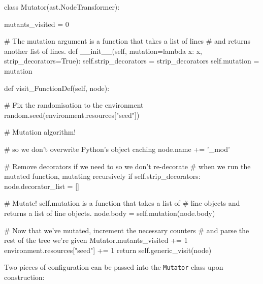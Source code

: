 \begin{pyglist}[language = python, caption={Mutator class}, listingname=\textbf{Code sample} \comment{, fvset={frame=single,framerule=1pt}}, numbers=left]
class Mutator(ast.NodeTransformer):

    mutants_visited = 0

    # The mutation argument is a function that takes a list of lines
    # and returns another list of lines.
    def __init__(self, mutation=lambda x: x, strip_decorators=True):
        self.strip_decorators = strip_decorators
        self.mutation = mutation

    def visit_FunctionDef(self, node):

        # Fix the randomisation to the environment
        random.seed(environment.resources["seed"])

        # Mutation algorithm!
        
        # so we don't overwrite Python's object caching
        node.name += '_mod'   
        
        # Remove decorators if we need to so we don't re-decorate
        # when we run the mutated function, mutating recursively
        if self.strip_decorators:
            node.decorator_list = []
        
        # Mutate! self.mutation is a function that takes a list of
        # line objects and returns a list of line objects.
        node.body = self.mutation(node.body)

        # Now that we've mutated, increment the necessary counters
        # and parse the rest of the tree we're given
        Mutator.mutants_visited += 1
        environment.resources["seed"] += 1
        return self.generic_visit(node)
\end{pyglist} \par

Two pieces of configuration can be passed into the \texttt{Mutator} class upon construction: \par

